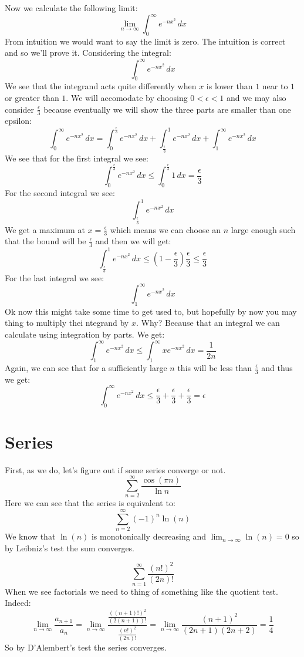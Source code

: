 \documentclass[11pt,a4paper]{article}
\begin{document}
	Now we calculate the following limit:
	\[
		\lim_{n\to\infty}{\int_{0}^{\infty}{e^{-nx^2}\,dx}}
	\]
	From intuition we would want to say the limit is zero. The intuition
	is correct and so we'll prove it. Considering the integral:
	\[
		\int_{0}^{\infty}{e^{-nx^2}\,dx}
	\]
	We see that the integrand acts quite differently when $x$ is lower than
	$1$ near to $1$ or greater than $1$. We will accomodate by choosing
	$0 < \epsilon < 1$ and we may also consider $\frac{\epsilon}{3}$ because
	eventually we will show the three parts are smaller than one epsilon:
	\[
		\int_{0}^{\infty}{e^{-nx^2}\,dx} = 
		\int_{0}^{\frac{\epsilon}{3}}{e^{-nx^2}\,dx} + 
		\int_{\frac{\epsilon}{3}}^{1}{e^{-nx^2}\,dx} + 
		\int_{1}^{\infty}{e^{-nx^2}\,dx}
	\]
	We see that for the first integral we see:
	\[
		\int_{0}^{\frac{\epsilon}{3}}{e^{-nx^2}\,dx} \le 
		\int_{0}^{\frac{\epsilon}{3}}{1\,dx} = \frac{\epsilon}{3}
	\]
	For the second integral we see:
	\[
		\int_{\frac{\epsilon}{3}}^{1}{e^{-nx^2}\,dx}
	\]
	We get a maximum at $x = \frac{\epsilon}{3}$ which means we can choose
	an $n$ large enough such that the bound will be $\frac{\epsilon}{3}$
	and then we will get:
	\[
		\int_{\frac{\epsilon}{3}}^{1}{e^{-nx^2}\,dx} \le 
		\left(1 - \frac{\epsilon}{3}\right)\frac{\epsilon}{3} \le 
		\frac{\epsilon}{3}
	\]
	For the last integral we see:
	\[
		\int_{1}^{\infty}{e^{-nx^2}\,dx}
	\]
	Ok now this might take some time to get used to, but hopefully by now
	you may thing to multiply thei ntegrand by $x$. Why? Because that
	an integral we can calculate using integration by parts. We get:
	\[
		\int_{1}^{\infty}{e^{-nx^2}\,dx} \le
		\int_{1}^{\infty}{xe^{-nx^2}\,dx} = \frac{1}{2n}
	\]
	Again, we can see that for a sufficiently large $n$ this will be less
	than $\frac{\epsilon}{3}$ and thus we get:
	\[
		\int_{0}^{\infty}{e^{-nx^2}\,dx} \le 
		\frac{\epsilon}{3} + \frac{\epsilon}{3} + \frac{\epsilon}{3} =
		\epsilon
	\]
	
	\newpage
	
	\section{Series}
	First, as we do, let's figure out if some series converge or not.
	\[
		\sum_{n=2}^{\infty}{\frac{\cos(\pi n)}{\ln n}}
	\]
	Here we can see that the series is equivalent to:
	\[
		\sum_{n=2}^{\infty}{(-1)^n\ln(n)}
	\]
	We know that $\ln(n)$ is monotonically decreasing and 
	$\lim_{n\to\infty}{\ln(n)} = 0$ so by Leibniz's test
	the sum converges.
	
	\newpage
	\[
		\sum_{n=1}^{\infty}{\frac{(n!)^2}{(2n)!}}
	\]
	When we see factorials we need to thing of something like the quotient
	test. Indeed:
	\[
		\lim_{n\to\infty}{\frac{a_{n+1}}{a_{n}}} = 
		\lim_{n\to\infty}{\frac{\frac{((n+1)!)^2}{(2(n+1))!}}{\frac{(n!)^2}
		{(2n)!}}} = 
		\lim_{n\to\infty}{\frac{(n+1)^2}{(2n+1)(2n+2)}} = 
		\frac{1}{4}
	\]
	So by D'Alembert's test the series converges.
	
\end{document}
